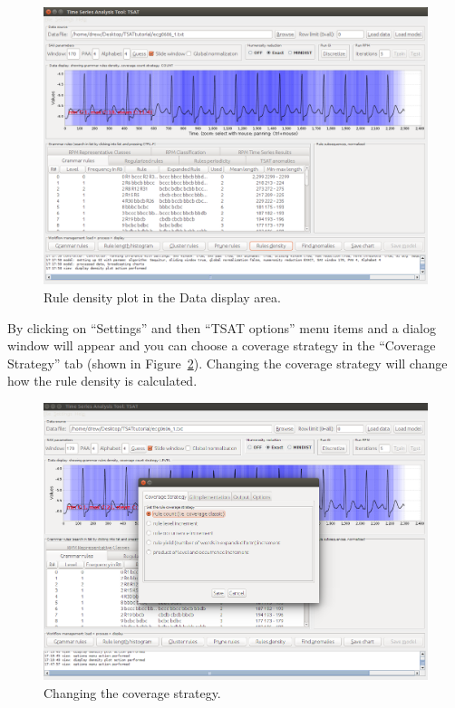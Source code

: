 \documentclass[titlepage, letterpaper, 12pt]{article}
\begin{document}
\begin{figure}[H]
	\centering
	\includegraphics[width=\textwidth]{pictures/motifguide/RuleDensity}
	\caption{Rule density plot in the Data display area.}
	\label{fig:ruledensity}
\end{figure}



By clicking on ``Settings'' and then ``TSAT options'' menu items and a dialog window will appear and you can choose a coverage strategy in the ``Coverage Strategy'' tab (shown in Figure~\ref{fig:coveragestrategy}). Changing the coverage strategy will change how the rule density is calculated.

\begin{figure}[H]
	\centering
	\includegraphics[width=\textwidth]{pictures/motifguide/coveragestrategy}
	\caption{Changing the coverage strategy.}
	\label{fig:coveragestrategy}
\end{figure}
\end{document}
